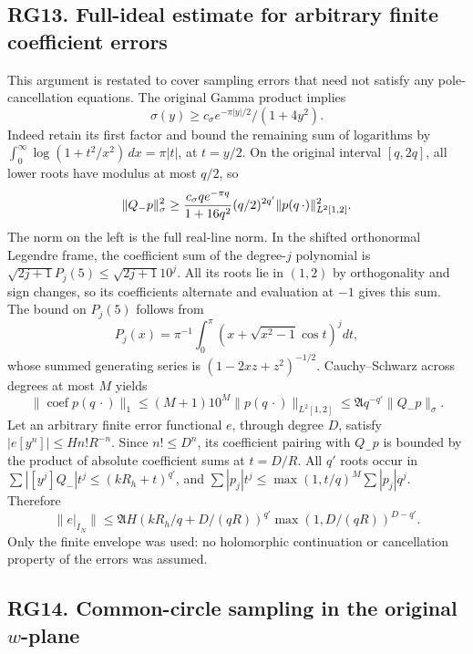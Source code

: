 \documentclass[11pt]{article}
\begin{document}
\subsection{RG13. Full-ideal estimate for arbitrary finite coefficient errors}\label{rg13.-full-ideal-estimate-for-arbitrary-finite-coefficient-errors}

This argument is restated to cover sampling errors that need not satisfy any pole-cancellation equations. The original Gamma product implies \[
\sigma(y)\ge c_\sigma e^{-\pi|y|/2}/(1+4y^2).
\] Indeed retain its first factor and bound the remaining sum of logarithms by \(\int_0^\infty\log(1+t^2/x^2)\,dx=\pi|t|\), at \(t=y/2\). On the original interval \([q,2q]\), all lower roots have modulus at most \(q/2\), so \[
\|Q_-p\|_\sigma^2\ge {c_\sigma q e^{-\pi q}\over1+16q^2}
(q/2)^{2q'}\|p(q\,\cdot)\|_{L^2[1,2]}^2.
\] The norm on the left is the full real-line norm. In the shifted orthonormal Legendre frame, the coefficient sum of the degree-\(j\) polynomial is \(\sqrt{2j+1}P_j(5)\le\sqrt{2j+1}10^j\). All its roots lie in \((1,2)\) by orthogonality and sign changes, so its coefficients alternate and evaluation at \(-1\) gives this sum. The bound on \(P_j(5)\) follows from \[
P_j(x)=\pi^{-1}\int_0^\pi(x+\sqrt{x^2-1}\cos t)^jdt,
\] whose summed generating series is \((1-2xz+z^2)^{-1/2}\). Cauchy--Schwarz across degrees at most \(M\) yields \[
\|\operatorname{coef}p(q\,\cdot)\|_1
\le(M+1)10^M\|p(q\,\cdot)\|_{L^2[1,2]}
\le\mathfrak A q^{-q'}\|Q_-p\|_\sigma.
\tag{RG39}
\] Let an arbitrary finite error functional \(e\), through degree \(D\), satisfy \(|e[y^n]|\le Hn!R^{-n}\). Since \(n!\le D^n\), its coefficient pairing with \(Q_-p\) is bounded by the product of absolute coefficient sums at \(t=D/R\). All \(q'\) roots occur in \(\sum|[y^j]Q_-|t^j\le(kR_h+t)^{q'}\), and \(\sum|p_j|t^j\le\max(1,t/q)^M\sum|p_j|q^j\). Therefore \[
\|e|_{I_N}\|\le\mathfrak A H
(kR_h/q+D/(qR))^{q'}\max(1,D/(qR))^{D-q'}.
\tag{RG40}
\] Only the finite envelope was used: no holomorphic continuation or cancellation property of the errors was assumed.

\subsection{\texorpdfstring{RG14. Common-circle sampling in the original \(w\)-plane}{RG14. Common-circle sampling in the original w-plane}}\label{rg14.-common-circle-sampling-in-the-original-w-plane}
\end{document}

